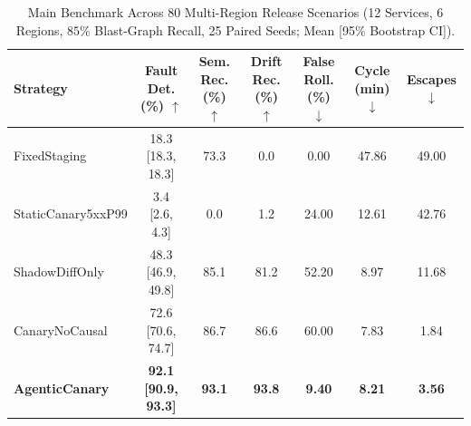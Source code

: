 \begin{table}[t]
\centering
\caption{Main Benchmark Across 80 Multi-Region Release Scenarios (12 Services, 6 Regions, $85\%$ Blast-Graph Recall, 25 Paired Seeds; Mean [95\% Bootstrap CI]).}
\label{tab:acv_main}
\begin{tabular}{lcccccc}
\toprule
\textbf{Strategy} & \textbf{Fault Det. (\%)} $\uparrow$ & \textbf{Sem. Rec. (\%)} $\uparrow$ & \textbf{Drift Rec. (\%)} $\uparrow$ & \textbf{False Roll. (\%)} $\downarrow$ & \textbf{Cycle (min)} $\downarrow$ & \textbf{Escapes} $\downarrow$ \\
\midrule
FixedStaging & 18.3 [18.3, 18.3] & 73.3 & 0.0 & 0.00 & 47.86 & 49.00 \\
StaticCanary5xxP99 & 3.4 [2.6, 4.3] & 0.0 & 1.2 & 24.00 & 12.61 & 42.76 \\
ShadowDiffOnly & 48.3 [46.9, 49.8] & 85.1 & 81.2 & 52.20 & 8.97 & 11.68 \\
CanaryNoCausal & 72.6 [70.6, 74.7] & 86.7 & 86.6 & 60.00 & 7.83 & 1.84 \\
\textbf{AgenticCanary} & \textbf{92.1 [90.9, 93.3]} & \textbf{93.1} & \textbf{93.8} & \textbf{9.40} & \textbf{8.21} & \textbf{3.56} \\
\bottomrule
\end{tabular}
\end{table}
